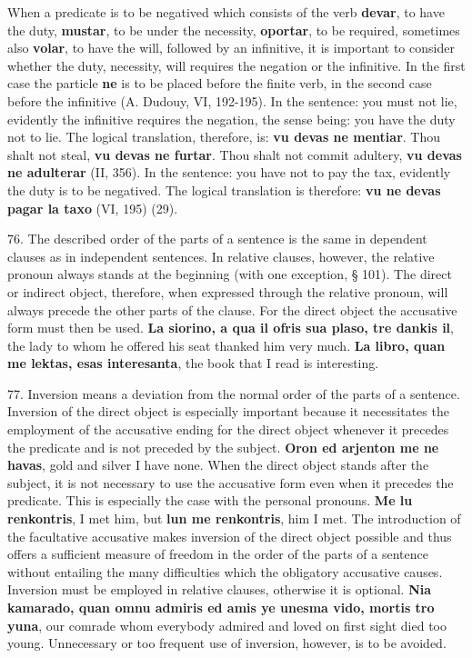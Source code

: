 When a predicate is to be negatived which consists of the verb \textbf{devar}, to have the duty, \textbf{mustar}, to be under the necessity, \textbf{oportar}, to be required, sometimes also \textbf{volar}, to have the will, followed by an infinitive, it is important to consider whether the duty, necessity, will requires the negation or the infinitive. In the first case the particle \textbf{ne} is to be placed before the finite verb, in the second case before the infinitive (A. Dudouy, VI, 192-195). In the sentence: you must not lie, evidently the infinitive requires the negation, the sense being: you have the duty not to lie. The logical translation, therefore, is: \textbf{vu devas ne mentiar}. Thou shalt not steal, \textbf{vu devas ne furtar}. Thou shalt not commit adultery, \textbf{vu devas ne adulterar} (II, 356). In the sentence: you have not to pay the tax, evidently the duty is to be negatived. The logical translation is therefore: \textbf{vu ne devas pagar la taxo} (VI, 195) (29). 

76. The described order of the parts of a sentence is the same in dependent clauses as in independent sentences. In relative clauses, however, the relative pronoun always stands at the beginning (with one exception, § 101). The direct or indirect object, therefore, when expressed through the relative pronoun, will always precede the other parts of the clause. For the direct object the accusative form must then be used. \textbf{La siorino, a qua il ofris sua plaso, tre dankis il}, the lady to whom he offered his seat thanked him very much. \textbf{La libro, quan me lektas, esas interesanta}, the book that I read is interesting. 

77. Inversion means a deviation from the normal order of the parts of a sentence. Inversion of the direct object is especially important because it necessitates the employment of the accusative ending for the direct object whenever it precedes the predicate and is not preceded by the subject. \textbf{Oron ed arjenton me ne havas}, gold and silver I have none. When the direct object stands after the subject, it is not necessary to use the accusative form even when it precedes the predicate. This is especially the case with the personal pronouns. \textbf{Me lu renkontris}, I met him, but \textbf{lun me renkontris}, him I met. The introduction of the facultative accusative makes inversion of the direct object possible and thus offers a sufficient measure of freedom in the order of the parts of a sentence without entailing the many difficulties which the obligatory accusative causes. Inversion must be employed in relative clauses, otherwise it is optional. \textbf{Nia kamarado, quan omnu admiris ed amis ye unesma vido, mortis tro yuna}, our comrade whom everybody admired and loved on first sight died too young. Unnecessary or too frequent use of inversion, however, is to be avoided. 

